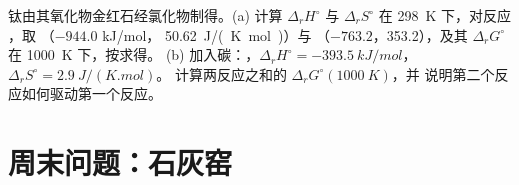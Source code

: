 \begin{exercise}[$\star\star\star$]\label{exo:b2:reaction-free-energy:12}
钛由其氧化物金红石经氯化物制得。(a) 计算
$\Delta_r H^\circ$ 与 $\Delta_r S^\circ$ 在 \qty{298}{K} 下，对反应 ，取 （$-944.0$ \unit{kJ/mol}，
\qty{50.62}{J/(K.mol)}）与 （$-763.2$，353.2），及其
$\Delta_r G^\circ$ 在 \qty{1000}{K} 下，按求得。
(b) 加入碳：，$\Delta_r H^\circ =
\qty{-393.5}{kJ/mol}$，$\Delta_r S^\circ = \qty{+2.9}{J/(K.mol)}$。
计算两反应之和的 $\Delta_r G^\circ(\qty{1000}{K})$，并
说明第二个反应如何驱动第一个反应。
\end{exercise}

\section{周末问题：石灰窑}

